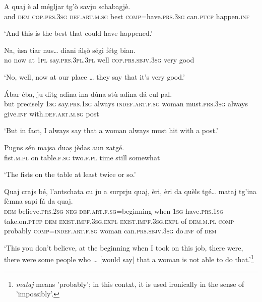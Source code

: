 \begin{linenumbers}
\gll A quaj è al mégljar tg’ò savju schabagjè.   \\
and \textsc{dem} \textsc{cop.prs.3sg} \textsc{def.art.m.sg} best \textsc{comp}=have.\textsc{prs.3sg} can.\textsc{ptcp} happen.\textsc{inf} \\
\end{linenumbers}
\medskip
\glt `And this is the best that could have happened.'
\medskip

\begin{linenumbers}
\gll   Na, ùsa tiar nus… diani álṣò ségi fétg bian. \\
no now at \textsc{1pl} say.\textsc{prs.3pl.3pl} well \textsc{cop.prs.sbjv.3sg} very good \\
\end{linenumbers}
\medskip
\glt `No, well, now at our place … they say that it’s very good.'
\medskip

\begin{linenumbers}
\gll Ábar éba, ju ditg adina ina dùna stù adina dá cul pal.   \\
but precisely \textsc{1sg} say.\textsc{prs.1sg} always \textsc{indef.art.f.sg} woman must.\textsc{prs.3sg} always  give.\textsc{inf} with.\textsc{def.art.m.sg} post  \\
\end{linenumbers}
\medskip
\glt `But in fact, I always say that a woman always must hit with a post.'
\medskip

\begin{linenumbers}
\gll Pugns sén majsa duaṣ jèdas aun zatgé.   \\
 fist.\textsc{m.pl} on table.\textsc{f.sg} two.\textsc{f.pl} time still somewhat\\
\end{linenumbers}
\medskip
\glt `The fists on the table at least twice or so.'
\medskip

\begin{linenumbers}
\gll  Quaj crajs bé, l’antschata cu ju a surprju quaj, èri, èri da quèls tgé… mataj tg’ina fèmna sapi fá da quaj.  \\
 \textsc{dem} believe.\textsc{prs.2sg} \textsc{neg} \textsc{def.art.f.sg=}beginning when \textsc{1sg} have.\textsc{prs.1sg} take.on.\textsc{ptcp} \textsc{dem}  \textsc{exist.impf.3sg.expl} \textsc{exist.impf.3sg.expl} of \textsc{dem.m.pl} \textsc{comp} probably \textsc{comp=indef.art.f.sg} woman can.\textsc{prs.sbjv.3sg} do.\textsc{inf} of   \textsc{dem}\\
\end{linenumbers}
\medskip
\glt `This you don’t believe, at the beginning when I took on this job, there were, there were some people who … [would say] that a woman is not able to do that.'\footnote{\textit{mataj} means 'probably'; in this contxt, it is used ironically in the sense of 'impossibly'.}
\medskip

